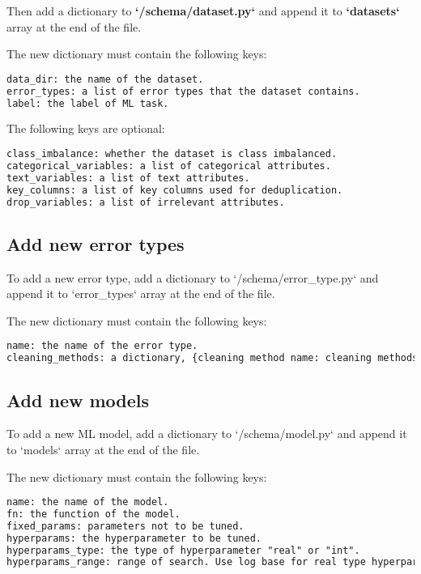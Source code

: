 
Then add a dictionary to \textbf{`/schema/dataset.py`} and append it to \textbf{`datasets`} array at the end of the file.

The new dictionary must contain the following keys:

\begin{lstlisting}[language=xml]
data_dir: the name of the dataset.
error_types: a list of error types that the dataset contains.
label: the label of ML task.
\end{lstlisting}

The following keys are optional:

\begin{lstlisting}[language=xml]
class_imbalance: whether the dataset is class imbalanced.
categorical_variables: a list of categorical attributes.
text_variables: a list of text attributes.
key_columns: a list of key columns used for deduplication.
drop_variables: a list of irrelevant attributes.
\end{lstlisting}

\subsection*{Add new error types}
To add a new error type, add a dictionary to `/schema/error\_type.py` and append it to `error\_types` array at the end of the file.

The new dictionary must contain the following keys:

\begin{lstlisting}[language=xml]
name: the name of the error type.
cleaning_methods: a dictionary, {cleaning method name: cleaning methods object}.
\end{lstlisting}

\subsection*{Add new models}
To add a new ML model, add a dictionary to `/schema/model.py` and append it to `models` array at the end of the file.

The new dictionary must contain the following keys:

\begin{lstlisting}[language=xml]
name: the name of the model.
fn: the function of the model.
fixed_params: parameters not to be tuned.
hyperparams: the hyperparameter to be tuned.
hyperparams_type: the type of hyperparameter "real" or "int".
hyperparams_range: range of search. Use log base for real type hyperparameters.
\end{lstlisting}


